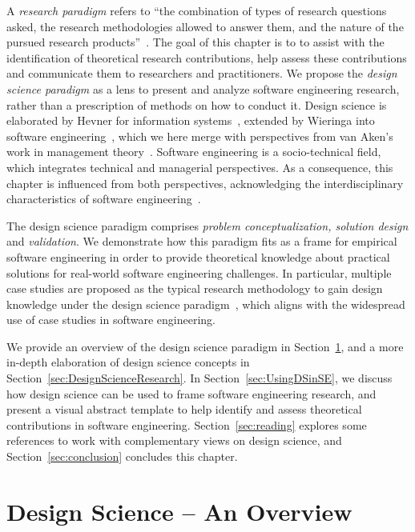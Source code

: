\documentclass[graybox]{svmult}
\newcommand{\emelie}[1]{\textcolor{red}{{\it [Emelie says: #1]}}}
\newcommand{\per}[1]{\textcolor{cyan}{{\it [Per says: #1]}}}
\newcommand{\emelie}[1]{}
\newcommand{\per}[1]{}
\begin{document}
A \emph{research paradigm} refers to ``the combination of types of research questions asked, the research methodologies allowed to answer them, and the nature of the pursued research products''~\cite{van_aken_management_2004}. The goal of  this chapter is to  to assist with the identification of theoretical research contributions, help assess these contributions and communicate them to researchers and practitioners. 
We propose the \emph{design science paradigm} as a lens to present and analyze software engineering research, rather than a prescription of methods on how to conduct it. 
Design science is elaborated by Hevner for information systems~\cite{hevner_design_2004},  extended by Wieringa into software engineering~\cite{wieringa_what_2014}, which we here merge with perspectives from van Aken's work in management theory~\cite{van_aken_management_2004}. Software engineering is a socio-technical field, which integrates technical and managerial perspectives. As a consequence, this chapter is influenced from both perspectives, acknowledging the interdisciplinary characteristics of software engineering~\cite{Mendez2019}. %

The design science paradigm comprises \emph{problem conceptualization, solution design} and \emph{validation}. We demonstrate how this paradigm fits as a frame for empirical software engineering in order to provide theoretical knowledge about practical solutions for real-world software engineering challenges. In particular, multiple case studies are proposed as the typical research methodology to gain design knowledge under the design science paradigm~\cite{van_aken_management_2004}, which aligns with the widespread use of case studies in software engineering. 

We provide an overview of the design science paradigm in Section~\ref{sec:overview}, and a more in-depth elaboration of design science concepts in Section~\ref{sec:DesignScienceResearch}. In Section~\ref{sec:UsingDSinSE}, we discuss how design science can be used to frame software engineering research, and present a visual abstract template to help identify and assess theoretical contributions in software engineering. Section~\ref{sec:reading} explores some references to work with complementary views on design science, and Section~\ref{sec:conclusion} concludes this chapter.


\section{Design Science -- An Overview}
\label{sec:overview}
\end{document}
